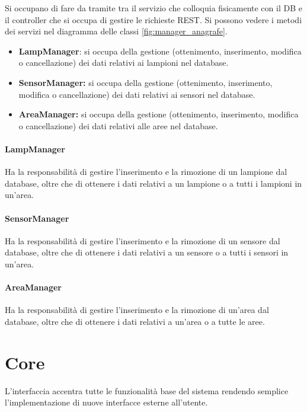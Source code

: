 Si occupano di fare da tramite tra il servizio che colloquia fisicamente con il DB e il controller che si occupa di gestire le richieste REST.
Si possono vedere i metodi dei servizi nel diagramma delle classi \ref{fig:manager_anagrafe}.

\begin{itemize}
    \item \textbf{LampManager}: si occupa della gestione (ottenimento, inserimento, modifica o cancellazione) dei dati relativi ai lampioni nel database.
    \item \textbf{SensorManager:} si occupa della gestione (ottenimento, inserimento, modifica o cancellazione) dei dati relativi ai sensori nel database. 
    \item \textbf{AreaManager:} si occupa della gestione (ottenimento, inserimento, modifica o cancellazione) dei dati relativi alle aree nel database.
\end{itemize}

\paragraph{LampManager}

Ha la responsabilità di gestire l'inserimento e la rimozione di un lampione dal database, oltre che di ottenere i dati relativi a un lampione o a tutti i lampioni in un'area.

\paragraph{SensorManager}

Ha la responsabilità di gestire l'inserimento e la rimozione di un sensore dal database, oltre che di ottenere i dati relativi a un sensore o a tutti i sensori in un'area.

\paragraph{AreaManager}
Ha la responsabilità di gestire l'inserimento e la rimozione di un'area dal database, oltre che di ottenere i dati relativi a un'area o a tutte le aree.

\section{Core}\label{sec:core} L'interfaccia accentra tutte le funzionalità base del sistema rendendo semplice l'implementazione di nuove interfacce esterne all'utente.

